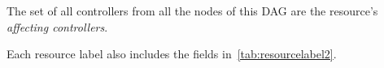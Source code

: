 \documentclass[a4paper,USenglish,cleveref, autoref, thm-restate, anonymous]{lipics-v2021}
\newcommand{\an}[1]{{\left\langle{{#1}}\right\rangle}}
\begin{document}


The set of all controllers from all the nodes of this DAG are the resource's \emph{affecting controllers}.




\noindent Each resource label also includes the fields
in~\cref{tab:resourcelabel2}.
\end{document}
